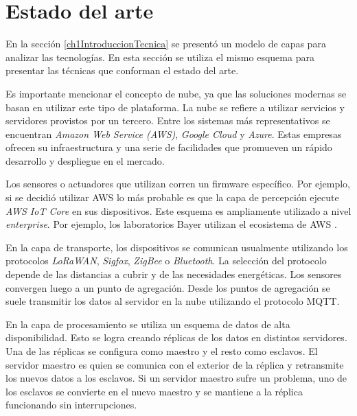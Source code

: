 \newpage

\section{Estado del arte}
\label{ch1EstadoDelArte}

En la sección \ref{ch1IntroduccionTecnica} se presentó un modelo de capas para analizar las tecnologías.
En esta sección se utiliza el mismo esquema para presentar las técnicas que conforman el estado del arte.

Es importante mencionar el concepto de nube, ya que las soluciones modernas se basan en utilizar este tipo de plataforma.
La nube se refiere a utilizar servicios y servidores provistos por un tercero.
Entre los sistemas más representativos se encuentran \emph{Amazon Web Service (AWS)}, \emph{Google Cloud} y \emph{Azure}.
Estas empresas ofrecen su infraestructura y una serie de facilidades que promueven un rápido desarrollo y despliegue en el mercado.

Los sensores o actuadores que utilizan corren un firmware específico.
Por ejemplo, si se decidió utilizar AWS lo más probable es que la capa de percepción ejecute \emph{AWS IoT Core} en sus dispositivos.
Este esquema es ampliamente utilizado a nivel \emph{enterprise}.
Por ejemplo, los laboratorios Bayer utilizan el ecosistema de AWS \citep{WEBSITE:AWSBayer}.

En la capa de transporte, los dispositivos se comunican usualmente utilizando los protocolos \emph{LoRaWAN}, \emph{Sigfox}, \emph{ZigBee} o \emph{Bluetooth}.
La selección del protocolo depende de las distancias a cubrir y de las necesidades energéticas.
Los sensores convergen luego a un punto de agregación.
Desde los puntos de agregación se suele transmitir los datos al servidor en la nube utilizando el protocolo MQTT.

En la capa de procesamiento se utiliza un esquema de datos de alta disponibilidad.
Esto se logra creando réplicas de los datos en distintos servidores.
Una de las réplicas se configura como maestro y el resto como esclavos.
El servidor maestro es quien se comunica con el exterior de la réplica y retransmite los nuevos datos a los esclavos.
Si un servidor maestro sufre un problema, uno de los esclavos se convierte en el nuevo maestro y se mantiene a la réplica funcionando sin interrupciones.

